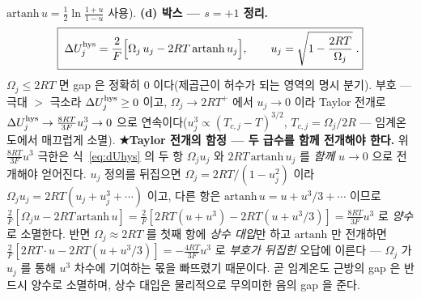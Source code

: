 $\mathrm{artanh}\,u=\tfrac12\ln\tfrac{1+u}{1-u}$ 사용). \textbf{(d) 박스 --- $s=+1$ 정리.}
\begin{equation}
\boxed{\;\Delta U_j^{\mathrm{hys}}
=\frac{2}{F}\Big[\Omega_j\,u_j-2RT\,\mathrm{artanh}\,u_j\Big],
\qquad u_j=\sqrt{1-\frac{2RT}{\Omega_j}}\;.}
\label{eq:dUhys}
\end{equation}
$\Omega_j\le2RT$ 면 gap 은
정확히 $0$ 이다(제곱근이 허수가 되는 영역의 명시 분기). 부호 --- 극대 $>$ 극소라 $\Delta U_j^{\mathrm{hys}}\ge0$ 이고, $\Omega_j\to2RT^+$ 에서
$u_j\to0$ 이라 Taylor 전개로 $\Delta U_j^{\mathrm{hys}}\to\frac{8RT}{3F}u_j^3\to0$ 으로
연속이다($u_j^3\propto(T_{c,j}-T)^{3/2}$, $T_{c,j}=\Omega_j/2R$ --- 임계온도에서 매끄럽게 소멸). \textbf{★Taylor 전개의 함정
--- 두 급수를 함께 전개해야 한다.} 위 $\frac{8RT}{3F}u^3$ 극한은 식~\eqref{eq:dUhys} 의 두 항 $\Omega_ju_j$ 와
$2RT\,\mathrm{artanh}\,u_j$ 를 \emph{함께} $u\to0$ 으로 전개해야 얻어진다. $u_j$ 정의를 뒤집으면
$\Omega_j=2RT/(1-u_j^2)$ 이라 $\Omega_ju_j=2RT(u_j+u_j^3+\cdots)$ 이고, 다른 항은 $\mathrm{artanh}\,u=u+u^3/3+\cdots$ 이므로
$\frac{2}{F}[\Omega_ju-2RT\,\mathrm{artanh}\,u]=\frac{2}{F}[2RT(u+u^3)-2RT(u+u^3/3)]=\frac{8RT}{3F}u^3$ 로 \emph{양수}로 소멸한다.
반면 $\Omega_j\approx2RT$ 를 첫째 항에 \emph{상수 대입}만 하고 $\mathrm{artanh}$ 만 전개하면
$\frac{2}{F}[2RT\cdot u-2RT(u+u^3/3)]=-\frac{4RT}{3F}u^3$ 로 \emph{부호가 뒤집힌} 오답에 이른다 --- $\Omega_j$ 가
$u_j$ 를 통해 $u^3$ 차수에 기여하는 몫을 빠뜨렸기 때문이다. 곧 임계온도 근방의 gap 은 반드시 양수로 소멸하며,
상수 대입은 물리적으로 무의미한 음의 gap 을 준다.

